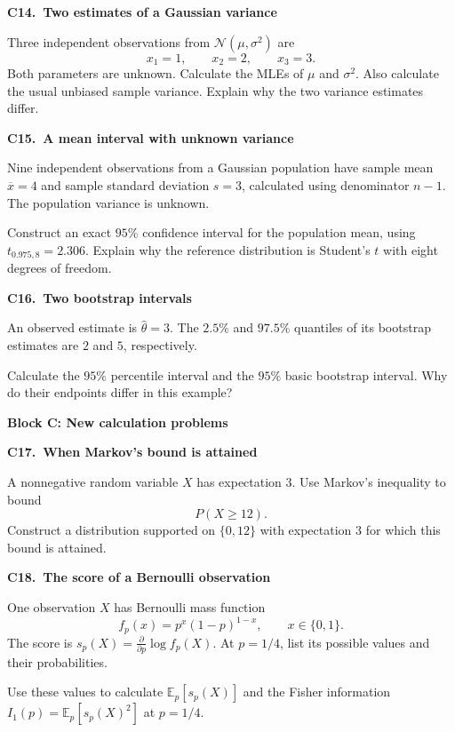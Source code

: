 \documentclass[11pt,a4paper]{article}
\newcommand{\blocktitle}[2]{{\Large\sffamily\bfseries\color{Ink}Block #1: #2}\par\vspace{5pt}}
\newenvironment{question}[2]{\par\addvspace{10pt}\begin{minipage}{\linewidth}{\sffamily\bfseries\color{Ink}#1.\ #2}\par\vspace{3pt}}{\end{minipage}\par}
\newcommand{\E}{\mathbb E}
\begin{document}
\begin{question}{C14}{Two estimates of a Gaussian variance}
Three independent observations from $\mathcal N(\mu,\sigma^2)$ are
\[
x_1=1,\qquad x_2=2,\qquad x_3=3.
\]
Both parameters are unknown. Calculate the MLEs of $\mu$ and $\sigma^2$.
Also calculate the usual unbiased sample variance. Explain why the two
variance estimates differ.
\end{question}

\begin{question}{C15}{A mean interval with unknown variance}
Nine independent observations from a Gaussian population have sample mean
$\overline x=4$ and sample standard deviation $s=3$, calculated using
denominator $n-1$. The population variance is unknown.

Construct an exact $95\%$ confidence interval for the population mean,
using $t_{0.975,8}=2.306$. Explain why the reference distribution is Student's
$t$ with eight degrees of freedom.
\end{question}

\begin{question}{C16}{Two bootstrap intervals}
An observed estimate is $\widehat\theta=3$. The $2.5\%$ and $97.5\%$
quantiles of its bootstrap estimates are $2$ and $5$, respectively.

Calculate the $95\%$ percentile interval and the $95\%$ basic bootstrap
interval. Why do their endpoints differ in this example?
\end{question}

\newpage
\blocktitle{C}{New calculation problems}
\begin{question}{C17}{When Markov's bound is attained}
A nonnegative random variable $X$ has expectation $3$.
Use Markov's inequality to bound
\[
P(X\ge12).
\]
Construct a distribution supported on $\{0,12\}$ with expectation $3$
for which this bound is attained.
\end{question}

\begin{question}{C18}{The score of a Bernoulli observation}
One observation $X$ has Bernoulli mass function
\[
f_p(x)=p^x(1-p)^{1-x},\qquad x\in\{0,1\}.
\]
The score is $s_p(X)=\frac{\partial}{\partial p}\log f_p(X)$.
At $p=1/4$, list its possible values and their probabilities.

Use these values to calculate $\E_p[s_p(X)]$ and the Fisher information
$I_1(p)=\E_p[s_p(X)^2]$ at $p=1/4$.
\end{question}
\end{document}
